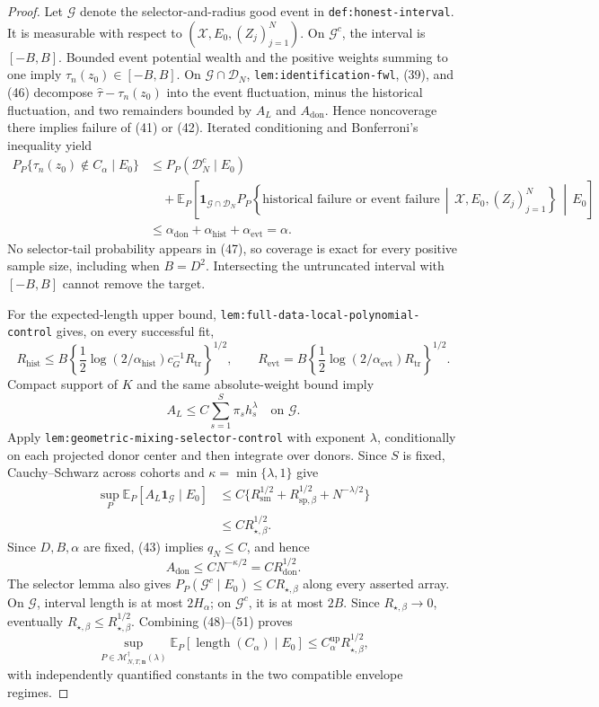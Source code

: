 \documentclass{article}
\begin{document}
\begin{proof}
Let \(\mathcal G\) denote the selector-and-radius good event in \texttt{def:honest-interval}.  It is measurable with respect to
\((\mathscr X,E_0,(Z_j)_{j=1}^{N})\).  On \(\mathcal G^c\), the interval is \([-B,B]\).  Bounded event potential wealth and the positive weights summing to one imply \(\tau_n(z_0)\in[-B,B]\).  On \(\mathcal G\cap\mathcal D_N\), \texttt{lem:identification-fwl}, (39), and (46) decompose \(\widehat\tau-\tau_n(z_0)\) into the event fluctuation, minus the historical fluctuation, and two remainders bounded by \(A_L\) and \(A_{\mathrm{don}}\).  Hence noncoverage there implies failure of (41) or (42).  Iterated conditioning and Bonferroni's inequality yield
\[
\begin{aligned}
P_P\{\tau_n(z_0)\notin C_\alpha\mid E_0\}
&\leq P_P(\mathcal D_N^c\mid E_0)\\
&\quad+\mathbb E_P\!\left[
\mathbf1_{\mathcal G\cap\mathcal D_N}
P_P\!\left\{
\text{historical failure or event failure}
\,\middle|\,\mathscr X,E_0,(Z_j)_{j=1}^{N}
\right\}
\,\middle|\,E_0\right]\\
&\leq\alpha_{\mathrm{don}}+\alpha_{\mathrm{hist}}+\alpha_{\mathrm{evt}}
=\alpha.
\end{aligned}
\tag{47}
\]
No selector-tail probability appears in (47), so coverage is exact for every positive sample size, including when \(B=D^2\).  Intersecting the untruncated interval with \([-B,B]\) cannot remove the target.

For the expected-length upper bound, \texttt{lem:full-data-local-polynomial-control} gives, on every successful fit,
\[
R_{\mathrm{hist}}
\leq B\left\{\frac12\log(2/\alpha_{\mathrm{hist}})c_G^{-1}R_{\mathrm{tr}}\right\}^{1/2},
\qquad
R_{\mathrm{evt}}
=B\left\{\frac12\log(2/\alpha_{\mathrm{evt}})R_{\mathrm{tr}}\right\}^{1/2}.
\tag{48}
\]
Compact support of \(K\) and the same absolute-weight bound imply
\[
A_L\leq C\sum_{s=1}^{S}\pi_sh_s^\lambda
\quad\text{on }\mathcal G.
\tag{49}
\]
Apply \texttt{lem:geometric-mixing-selector-control} with exponent \(\lambda\), conditionally on each projected donor center and then integrate over donors.  Since \(S\) is fixed, Cauchy--Schwarz across cohorts and \(\kappa=\min\{\lambda,1\}\) give
\[
\begin{aligned}
\sup_P\mathbb E_P[A_L\mathbf1_{\mathcal G}\mid E_0]
&\leq C\{R_{\mathrm{sm}}^{1/2}
+R_{\mathrm{sp},\beta}^{1/2}+N^{-\lambda/2}\}\\
&\leq CR_{\star,\beta}^{1/2}.
\end{aligned}
\tag{50}
\]
Since \(D,B,\alpha\) are fixed, (43) implies \(q_N\leq C\), and hence
\[
A_{\mathrm{don}}\leq CN^{-\kappa/2}=CR_{\mathrm{don}}^{1/2}.
\tag{51}
\]
The selector lemma also gives
\(P_P(\mathcal G^c\mid E_0)\leq CR_{\star,\beta}\) along every asserted array.  On \(\mathcal G\), interval length is at most \(2H_\alpha\); on \(\mathcal G^c\), it is at most \(2B\).  Since \(R_{\star,\beta}\to0\), eventually \(R_{\star,\beta}\leq R_{\star,\beta}^{1/2}\).  Combining (48)--(51) proves
\[
\sup_{P\in\mathcal M_{N,T,\mathbf n}^{\dagger}(\lambda)}
\mathbb E_P[\operatorname{length}(C_\alpha)\mid E_0]
\leq C_\alpha^{\mathrm{up}}R_{\star,\beta}^{1/2},
\tag{52}
\]
with independently quantified constants in the two compatible envelope regimes.


\end{proof}
\end{document}
